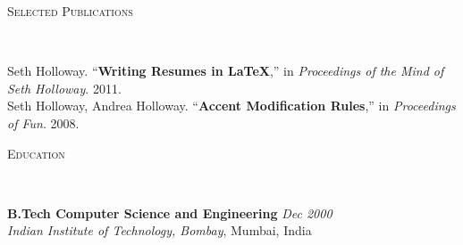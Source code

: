 \documentclass[9pt]{article}
\newenvironment{changemargin}[2]{%
  \begin{list}{}{%
    \setlength{\topsep}{0pt}%
    \setlength{\leftmargin}{#1}%
    \setlength{\rightmargin}{#2}%
    \setlength{\listparindent}{\parindent}%
    \setlength{\itemindent}{\parindent}%
    \setlength{\parsep}{\parskip}%
  }%
  \item[]}{\end{list}
}
\newcommand{\lineover}{
	\begin{changemargin}{-0.05in}{-0.05in}
		\vspace*{-8pt}
		\hrulefill \\
		\vspace*{-2pt}
	\end{changemargin}
}
\newcommand{\header}[1]{
	\begin{changemargin}{-0.5in}{-0.5in}
		\scshape{#1}\\
  	\lineover
	\end{changemargin}
}
\newenvironment{body} {
	\vspace*{-16pt}
	\begin{changemargin}{-0.25in}{-0.5in}
  }	
	{\end{changemargin}
}
\begin{document}
\smallskip



\header{Selected Publications}

\begin{body}
	\vspace{14pt}
	Seth Holloway. ``\textbf{Writing Resumes in LaTeX},'' in \emph{Proceedings of the Mind of Seth Holloway}. 2011.\\
	\smallskip
	Seth Holloway, Andrea Holloway. ``\textbf{Accent Modification Rules},'' in \emph{Proceedings of Fun}. 2008.\\
\end{body}

\smallskip



\header{Education}

\begin{body}
	\vspace{14pt}
	\textbf{B.Tech Computer Science and Engineering}{} \hfill \emph{Dec 2000}{} \\
	\emph{Indian Institute of Technology, Bombay}, Mumbai, India{} \\
\end{body}

\smallskip
\end{document}
